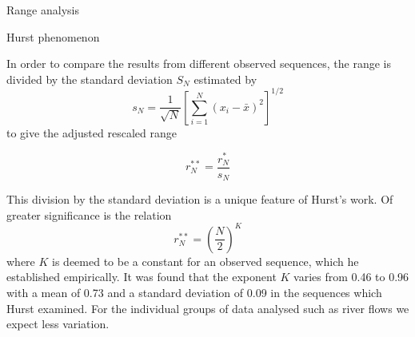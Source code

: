 \documentclass[8pt]{beamer}
\renewcommand{\emph}[1]{\textcolor{myorange}{#1}}
\begin{document}
 \begin{frame}{Range analysis}
    \begin{block}{Hurst phenomenon}
    \end{block}
In order to compare the results from different observed sequences, the \emph{range} is divided by the \emph{standard deviation} $S_N$ estimated by 
\[
    s_N = \frac{1}{\sqrt{N}} \left[ \sum_{i=1}^N (x_i - \bar{x})^2 \right]^{1/2}
\]
to give the adjusted rescaled range

\begin{equation}
    r_N^{**} = \frac{r_N^*}{s_N}
    \label{e515}
    \end{equation}

    This division by the \emph{standard deviation} is a unique feature of \emph{Hurst's work}. Of greater significance is the relation
\begin{equation}
    r_N^{**} = \left(\frac{N}{2} \right)^K
    \label{e516}
    \end{equation}
    where $K$ is deemed to be a constant for an observed sequence, which he established empirically. It was found that the exponent $K$ varies from 0.46 to 0.96 with a mean of 0.73 and a \emph{standard deviation} of 0.09 in the sequences which \emph{Hurst} examined. For the individual groups of data analysed such as \emph{river flows} we expect less variation. 

\end{frame}
\end{document}

